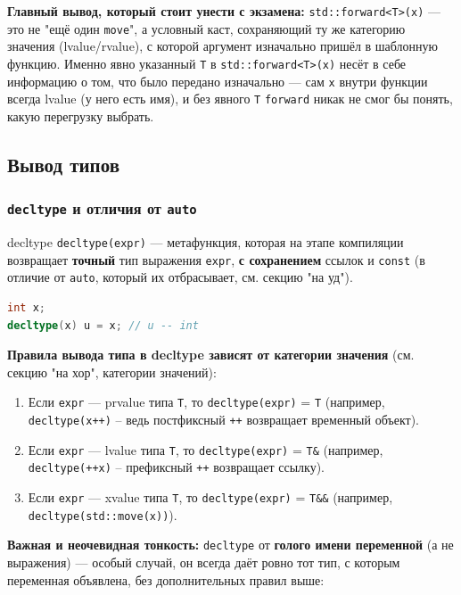 \textbf{Главный вывод, который стоит унести с экзамена:} \texttt{std::forward<T>(x)} --- это не "ещё один \texttt{move}", а условный каст, сохраняющий ту же категорию значения (lvalue/rvalue), с которой аргумент изначально пришёл в шаблонную функцию. Именно явно указанный \texttt{T} в \texttt{std::forward<T>(x)} несёт в себе информацию о том, что было передано изначально --- сам \texttt{x} внутри функции всегда lvalue (у него есть имя), и без явного \texttt{T} \texttt{forward} никак не смог бы понять, какую перегрузку выбрать.

\subsection{Вывод типов}
\subsubsection{\texttt{decltype} и отличия от \texttt{auto}}
\begin{definition}{decltype}{}
\texttt{decltype(expr)} --- метафункция, которая на этапе компиляции возвращает \textbf{точный} тип выражения \texttt{expr}, \textbf{с сохранением} ссылок и \texttt{const} (в отличие от \texttt{auto}, который их отбрасывает, см. секцию "на уд").
\end{definition}
\begin{lstlisting}[language=C++]
int x;
decltype(x) u = x; // u -- int
\end{lstlisting}
\textbf{Правила вывода типа в decltype зависят от категории значения} (см. секцию "на хор", категории значений):
\begin{enumerate}
  \item Если \texttt{expr} --- prvalue типа \texttt{T}, то \texttt{decltype(expr)} = \texttt{T} (например, \texttt{decltype(x++)} -- ведь постфиксный \texttt{++} возвращает временный объект).
  \item Если \texttt{expr} --- lvalue типа \texttt{T}, то \texttt{decltype(expr)} = \texttt{T\&} (например, \texttt{decltype(++x)} -- префиксный \texttt{++} возвращает ссылку).
  \item Если \texttt{expr} --- xvalue типа \texttt{T}, то \texttt{decltype(expr)} = \texttt{T\&\&} (например, \texttt{decltype(std::move(x))}).
\end{enumerate}
\textbf{Важная и неочевидная тонкость:} \texttt{decltype} от \textbf{голого имени переменной} (а не выражения) --- особый случай, он всегда даёт ровно тот тип, с которым переменная объявлена, без дополнительных правил выше:
